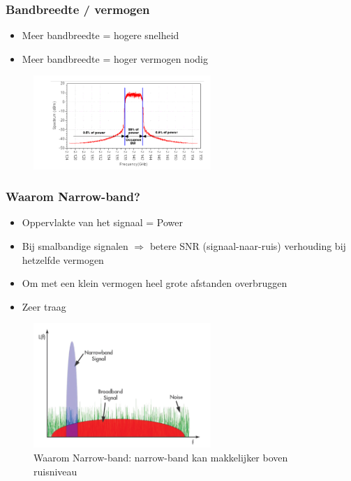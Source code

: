 \documentclass{article}
\begin{document}
\subsubsection{Bandbreedte / vermogen}
\begin{itemize}
    \item Meer bandbreedte = hogere snelheid
    \item Meer bandbreedte = hoger vermogen nodig
\end{itemize}

\begin{figure}[H]
    \centering
    \includegraphics[width=0.6\textwidth]{Screenshot_20200302_122703.png}
    \caption{}
\end{figure}


\subsubsection{Waarom Narrow-band?}
\begin{itemize}
    \item Oppervlakte van het signaal = Power
    \item Bij smalbandige signalen $\Rightarrow$ betere SNR (signaal-naar-ruis) verhouding bij hetzelfde vermogen
    \item Om met een klein vermogen heel grote afstanden overbruggen
    \item Zeer traag
\end{itemize}

\begin{figure}[H]
    \centering
    \includegraphics[width=0.6\textwidth]{Screenshot_20200302_123310.png}
    \caption{Waarom Narrow-band: narrow-band kan makkelijker boven ruisniveau}
\end{figure}
\end{document}
